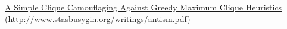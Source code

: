 \begin{thebibliography}{1}

 \href{http://www.stasbusygin.org/writings/antism.pdf}{A Simple Clique Camouflaging Against Greedy Maximum Clique Heuristics}\\
(http://www.stasbusygin.org/writings/antism.pdf)

\end{thebibliography}